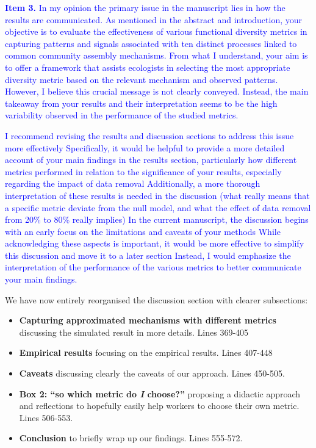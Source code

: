 \documentclass[
]{article}
\begin{document}
\textcolor{blue}{\textbf{Item 3.}}
\textcolor{blue}{In my opinion the primary issue in the manuscript lies in how the results are communicated.
As mentioned in the abstract and introduction, your objective is to evaluate the effectiveness of various functional diversity metrics in capturing patterns and signals associated with ten distinct processes linked to common community assembly mechanisms.
From what I understand, your aim is to offer a framework that assists ecologists in selecting the most appropriate diversity metric based on the relevant mechanism and observed patterns.
However, I believe this crucial message is not clearly conveyed.
Instead, the main takeaway from your results and their interpretation seems to be the high variability observed in the performance of the studied metrics.}

\textcolor{blue}{I recommend revising the results and discussion sections to address this issue more effectively
Specifically, it would be helpful to provide a more detailed account of your main findings in the results section, particularly how different metrics performed in relation to the significance of your results, especially regarding the impact of data removal
Additionally, a more thorough interpretation of these results is needed in the discussion (what really means that a specific metric deviate from the null model, and what the effect of data removal from 20\% to 80\% really implies)
In the current manuscript, the discussion begins with an early focus on the limitations and caveats of your methods
While acknowledging these aspects is important, it would be more effective to simplify this discussion and move it to a later section
Instead, I would emphasize the interpretation of the performance of the various metrics to better communicate your main findings.}

We have now entirely reorganised the discussion section with clearer subsections:

\begin{itemize} 
  \item \textbf{Capturing approximated mechanisms with different metrics} discussing the simulated result in more details. Lines 369-405
  \item \textbf{Empirical results} focusing on the empirical results. Lines 407-448
  \item \textbf{Caveats} discussing clearly the caveats of our approach. Lines 450-505.
  \item  \textbf{Box 2: ``so which metric do \textit{I} choose?''} proposing a didactic approach and reflections to hopefully easily help workers to choose their own metric. Lines 506-553.
  \item \textbf{Conclusion} to briefly wrap up our findings. Lines 555-572.
\end{itemize}
\end{document}
